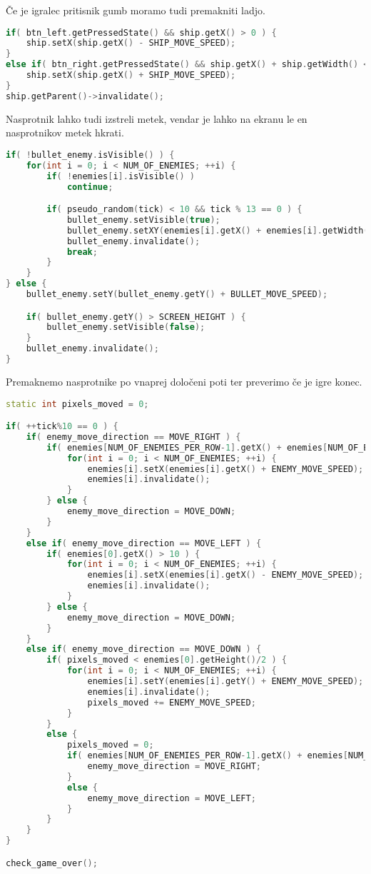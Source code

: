 \documentclass{article}
\begin{document}
\noindent
\v{C}e je igralec pritisnik gumb moramo tudi premakniti ladjo.
\begin{lstlisting}[language=c++]
if( btn_left.getPressedState() && ship.getX() > 0 ) {
    ship.setX(ship.getX() - SHIP_MOVE_SPEED);
}
else if( btn_right.getPressedState() && ship.getX() + ship.getWidth() < SCREEN_WIDTH ) {
    ship.setX(ship.getX() + SHIP_MOVE_SPEED);
}
ship.getParent()->invalidate();
\end{lstlisting}

\noindent
Nasprotnik lahko tudi izstreli metek, vendar je lahko na ekranu
le en nasprotnikov metek hkrati.
\begin{lstlisting}[language=c++]
if( !bullet_enemy.isVisible() ) {
    for(int i = 0; i < NUM_OF_ENEMIES; ++i) {
        if( !enemies[i].isVisible() )
            continue;

        if( pseudo_random(tick) < 10 && tick % 13 == 0 ) {
            bullet_enemy.setVisible(true);
            bullet_enemy.setXY(enemies[i].getX() + enemies[i].getWidth()/2, enemies[i].getY() + enemies[i].getHeight());
            bullet_enemy.invalidate();
            break;
        }
    }
} else {
    bullet_enemy.setY(bullet_enemy.getY() + BULLET_MOVE_SPEED);

    if( bullet_enemy.getY() > SCREEN_HEIGHT ) {
        bullet_enemy.setVisible(false);
    }
    bullet_enemy.invalidate();
}
\end{lstlisting}

\noindent
Premaknemo nasprotnike po vnaprej dolo\v{c}eni poti ter preverimo
\v{c}e je igre konec.
\begin{lstlisting}[language=c++]
static int pixels_moved = 0;

if( ++tick%10 == 0 ) {
    if( enemy_move_direction == MOVE_RIGHT ) {
        if( enemies[NUM_OF_ENEMIES_PER_ROW-1].getX() + enemies[NUM_OF_ENEMIES_PER_ROW].getWidth() < SCREEN_WIDTH ) {
            for(int i = 0; i < NUM_OF_ENEMIES; ++i) {
                enemies[i].setX(enemies[i].getX() + ENEMY_MOVE_SPEED);
                enemies[i].invalidate();
            }
        } else {
            enemy_move_direction = MOVE_DOWN;
        }
    }
    else if( enemy_move_direction == MOVE_LEFT ) {
        if( enemies[0].getX() > 10 ) {
            for(int i = 0; i < NUM_OF_ENEMIES; ++i) {
                enemies[i].setX(enemies[i].getX() - ENEMY_MOVE_SPEED);
                enemies[i].invalidate();
            }
        } else {
            enemy_move_direction = MOVE_DOWN;
        }
    }
    else if( enemy_move_direction == MOVE_DOWN ) {
        if( pixels_moved < enemies[0].getHeight()/2 ) {
            for(int i = 0; i < NUM_OF_ENEMIES; ++i) {
                enemies[i].setY(enemies[i].getY() + ENEMY_MOVE_SPEED);
                enemies[i].invalidate();
                pixels_moved += ENEMY_MOVE_SPEED;
            }
        }
        else {
            pixels_moved = 0;
            if( enemies[NUM_OF_ENEMIES_PER_ROW-1].getX() + enemies[NUM_OF_ENEMIES_PER_ROW].getWidth() < SCREEN_WIDTH ) {
                enemy_move_direction = MOVE_RIGHT;
            }
            else {
                enemy_move_direction = MOVE_LEFT;
            }
        }
    }
}

check_game_over();
\end{lstlisting}
\end{document}
